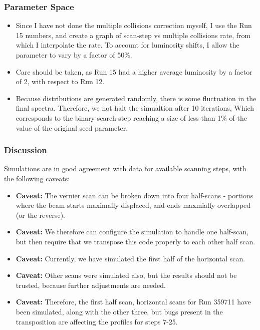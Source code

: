 \begin{frame}
	\frametitle{Parameter Space}
	\begin{itemize}
		\item Since I have not done the multiple collisions correction myself, I
			use the Run 15 numbers, and create a graph of scan-step vs multiple
			collisions rate, from which I interpolate the rate. To account for
			luminosity shifts, I allow the parameter to vary by a factor of 50\%.
		\item Care should be taken, as Run 15 had a higher average luminosity by a
			factor of 2, with respect to Run 12.
		\item Because distributions are generated randomly, there is some
			fluctuation in the final spectra. Therefore, we not halt the simualtion
			after 10 iterations, Which corresponds to the binary search step reaching
			a size of less than 1\% of the value of the original seed parameter.
	\end{itemize}
\end{frame}

\begin{frame}
\frametitle{Discussion}
Simulations are in good agreement with data for available scanning steps, with
the following caveats:
\begin{itemize}
	\item \textbf{Caveat:} The vernier scan can be broken down into four
		half-scans - portions where the beam starts maximally displaced, and ends
		maxmially overlapped (or the reverse).
	\item \textbf{Caveat:} We therefore can configure the simulation to handle
		one half-scan, but then require that we transpose this code properly to
		each other half scan.
\item \textbf{Caveat:} Currently, we have simulated the first half of the
	horizontal scan.
\item \textbf{Caveat:} Other scans were simulated also, but the results should
	not be trusted, because further adjustments are needed.
\item \textbf{Caveat:} Therefore, the first half scan, horizontal scans for Run
	359711 have been simulated, along with the other three, but bugs present in
	the transposition are affecting the profiles for steps 7-25.
\end{itemize}

\end{frame}


